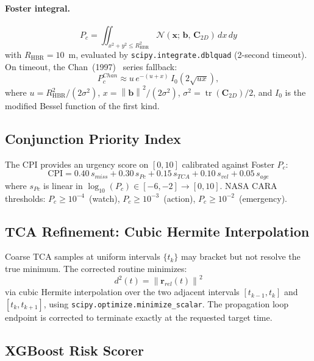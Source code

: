 \documentclass[conference]{IEEEtran}
\newcommand{\norm}[1]{\left\|#1\right\|}
\newcommand{\bvec}[1]{\mathbf{#1}}
\newcommand{\Pc}{P_c}
\newcommand{\RHBR}{R_{\mathrm{HBR}}}
\DeclareMathOperator{\tr}{tr}
\begin{document}
\paragraph{Foster integral.}
\begin{equation}
  \Pc = \iint_{x^2+y^2\leq \RHBR^2}
    \mathcal{N}(\bvec{x};\,\bvec{b},\,\bvec{C}_{2D})\,dx\,dy
\label{eq:foster}
\end{equation}
%
with $\RHBR = 10$~m, evaluated by \texttt{scipy.integrate.dblquad}
(2-second timeout). On timeout, the Chan~(1997)~\cite{chan1997} series fallback:
%
\begin{equation}
  \Pc^{Chan} \approx u\,e^{-(u+x)}\,I_0\!\left(2\sqrt{ux}\right),
\end{equation}
%
where $u = \RHBR^2/(2\sigma^2)$, $x = \norm{\bvec{b}}^2/(2\sigma^2)$,
$\sigma^2 = \tr(\bvec{C}_{2D})/2$, and $I_0$ is the modified Bessel function
of the first kind.

\subsection{Conjunction Priority Index}

The CPI provides an urgency score on $[0,10]$ calibrated against Foster $\Pc$:
%
\begin{equation}
  \mathrm{CPI} =
    0.40\,s_{miss}
  + 0.30\,s_{Pc}
  + 0.15\,s_{TCA}
  + 0.10\,s_{vel}
  + 0.05\,s_{age}
\end{equation}
%
where $s_{Pc}$ is linear in $\log_{10}(\Pc)\in[-6,-2]\to[0,10]$. NASA CARA
thresholds: $\Pc\geq10^{-4}$~(watch), $\Pc\geq10^{-3}$~(action),
$\Pc\geq10^{-2}$~(emergency).

\subsection{TCA Refinement: Cubic Hermite Interpolation}

Coarse TCA samples at uniform intervals $\{t_k\}$ may bracket but not resolve
the true minimum. The corrected routine minimizes:
%
\begin{equation}
  d^2(t) = \norm{\bvec{r}_{rel}(t)}^2
\end{equation}
%
via cubic Hermite interpolation over the two adjacent intervals
$[t_{k-1},t_k]$ and $[t_k,t_{k+1}]$, using
\texttt{scipy.optimize.minimize\_scalar}. The propagation loop endpoint is
corrected to terminate exactly at the requested target time.

\subsection{XGBoost Risk Scorer}
\end{document}
